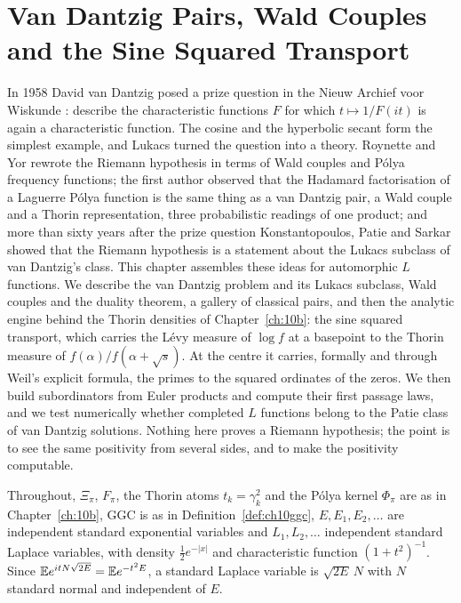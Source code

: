 \chapter[Van Dantzig Pairs and Transport]{Van Dantzig Pairs, Wald Couples and the Sine Squared Transport}\label{ch:10d}

In 1958 David van Dantzig posed a prize question in the Nieuw Archief voor Wiskunde \cite{vandantzig1958}: describe the characteristic functions $F$ for which $t\mapsto1/F(it)$ is again a characteristic function. The cosine and the hyperbolic secant form the simplest example, and Lukacs \cite{lukacs1968,lukacs1970} turned the question into a theory. Roynette and Yor \cite{roynetteyor2005} rewrote the Riemann hypothesis in terms of Wald couples and P\'olya frequency functions; the first author \cite{polson2018vdp} observed that the Hadamard factorisation of a Laguerre P\'olya function is the same thing as a van Dantzig pair, a Wald couple and a Thorin representation, three probabilistic readings of one product; and more than sixty years after the prize question Konstantopoulos, Patie and Sarkar \cite{konstantopoulospatiesarkar2024} showed that the Riemann hypothesis is a statement about the Lukacs subclass of van Dantzig's class. This chapter assembles these ideas for automorphic $L$ functions. We describe the van Dantzig problem and its Lukacs subclass, Wald couples and the duality theorem, a gallery of classical pairs, and then the analytic engine behind the Thorin densities of Chapter~\ref{ch:10b}: the sine squared transport, which carries the L\'evy measure of $\log f$ at a basepoint to the Thorin measure of $f(\alpha)/f(\alpha+\sqrt s)$. At the centre it carries, formally and through Weil's explicit formula, the primes to the squared ordinates of the zeros. We then build subordinators from Euler products and compute their first passage laws, and we test numerically whether completed $L$ functions belong to the Patie class of van Dantzig solutions. Nothing here proves a Riemann hypothesis; the point is to see the same positivity from several sides, and to make the positivity computable.

Throughout, $\Xi_\pi$, $F_\pi$, the Thorin atoms $t_k=\gamma_k^2$ and the P\'olya kernel $\Phi_\pi$ are as in Chapter~\ref{ch:10b}, GGC is as in Definition~\ref{def:ch10ggc}, $E,E_1,E_2,\dots$ are independent standard exponential variables and $L_1,L_2,\dots$ independent standard Laplace variables, with density $\frac12e^{-|x|}$ and characteristic function $(1+t^2)^{-1}$. Since $\mathbb{E} e^{itN\sqrt{2E}} = \mathbb{E} e^{-t^2E}$, a standard Laplace variable is $\sqrt{2E}\,N$ with $N$ standard normal and independent of $E$.

